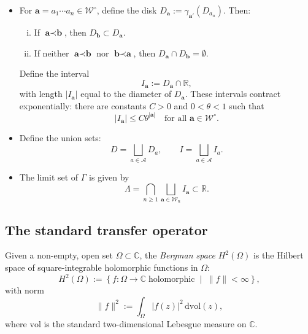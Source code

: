\documentclass[12pt,letterpaper]{amsart}
\theoremstyle{plain}
\theoremstyle{definition}
\theoremstyle{remark}
\newcommand{\Aa}{\textbf{a}}
\newcommand{\Bb}{\textbf{b}}
\newcommand{\CC}{\mathbb{C}}
\begin{document}
\begin{itemize}
\item For $\Aa = a_1 \cdots a_n \in \mathcal{W}^\circ$, define the disk $D_\Aa := \gamma_{\Aa'}(D_{a_n})$. Then:
\begin{enumerate}[(i)]
  \item If $\Aa \prec \Bb$, then $D_\Bb \subset D_\Aa$.
  \item If neither $\Aa \prec \Bb$ nor $\Bb \prec \Aa$, then $D_\Aa \cap D_\Bb = \emptyset$.
\end{enumerate}
Define the interval
\[
I_\Aa := D_\Aa \cap \mathbb{R},
\]
with length $|I_\Aa|$ equal to the diameter of $D_\Aa$. These intervals contract exponentially: there are constants $C > 0$ and $0 < \theta < 1$ such that
\begin{equation}\label{eq:unifContraction}
|I_\Aa| \le C \theta^{|\Aa|} \quad \text{for all } \Aa \in \mathcal{W}^\circ.
\end{equation}

\item Define the union sets:
\[
D = \bigsqcup_{a \in \mathcal{A}} D_a, \qquad I = \bigsqcup_{a \in \mathcal{A}} I_a.
\]

\item The limit set of $\Gamma$ is given by
\[
\Lambda = \bigcap_{n \ge 1} \bigsqcup_{\Aa \in \mathcal{W}_n} I_\Aa \subset \mathbb{R}.
\]
\end{itemize}

\subsection{The standard transfer operator}\label{sec:classicalTransfOper}
Given a non-empty, open set $\Omega \subset \CC$, the \textit{Bergman space} $H^2(\Omega)$ is the Hilbert space of square-integrable holomorphic functions in $\Omega$:
\begin{equation}\label{defi_bergman}
H^2(\Omega) := \left\{ f \colon \Omega \to \CC \;\text{holomorphic} \;\middle|\; \|f\| < \infty \right\},
\end{equation}
with norm
\[
\|f\|^2 := \int_\Omega |f(z)|^2 \, \mathrm{dvol}(z),
\]
where $\mathrm{vol}$ is the standard two-dimensional Lebesgue measure on $\CC$.
\end{document}
